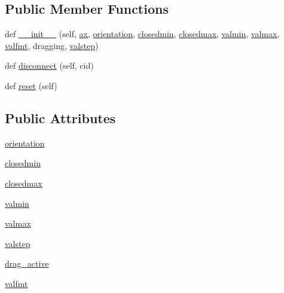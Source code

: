 \subsection*{Public Member Functions}
\begin{DoxyCompactItemize}
\item 
def \hyperlink{classmatplotlib_1_1widgets_1_1SliderBase_a01c50f7d46e6e75af375c1a9241daeb4}{\+\_\+\+\_\+init\+\_\+\+\_\+} (self, \hyperlink{classmatplotlib_1_1widgets_1_1AxesWidget_ac0722858b7001d10a42055dc90420b4f}{ax}, \hyperlink{classmatplotlib_1_1widgets_1_1SliderBase_a93fc7869d4f43ed80c0eb37f862a7867}{orientation}, \hyperlink{classmatplotlib_1_1widgets_1_1SliderBase_aaacaef7e24bbf0e58411e11bab0f6251}{closedmin}, \hyperlink{classmatplotlib_1_1widgets_1_1SliderBase_a250e05d4e913ab64f1aab8199139121e}{closedmax}, \hyperlink{classmatplotlib_1_1widgets_1_1SliderBase_a993fb203f18eed971f45cc5cefe46b75}{valmin}, \hyperlink{classmatplotlib_1_1widgets_1_1SliderBase_a43671ae3d4d11d7b5cc1f057d6906d7d}{valmax}, \hyperlink{classmatplotlib_1_1widgets_1_1SliderBase_a30eb223d32ca95faa7bd011bb5dc1836}{valfmt}, dragging, \hyperlink{classmatplotlib_1_1widgets_1_1SliderBase_acc8d1e84849e95324ba5261011d7ffdc}{valstep})
\item 
def \hyperlink{classmatplotlib_1_1widgets_1_1SliderBase_a7516628d3047311581947d97cf45fb7c}{disconnect} (self, cid)
\item 
def \hyperlink{classmatplotlib_1_1widgets_1_1SliderBase_a71d66da13cf09d2e78f82e37ef7198a5}{reset} (self)
\end{DoxyCompactItemize}
\subsection*{Public Attributes}
\begin{DoxyCompactItemize}
\item 
\hyperlink{classmatplotlib_1_1widgets_1_1SliderBase_a93fc7869d4f43ed80c0eb37f862a7867}{orientation}
\item 
\hyperlink{classmatplotlib_1_1widgets_1_1SliderBase_aaacaef7e24bbf0e58411e11bab0f6251}{closedmin}
\item 
\hyperlink{classmatplotlib_1_1widgets_1_1SliderBase_a250e05d4e913ab64f1aab8199139121e}{closedmax}
\item 
\hyperlink{classmatplotlib_1_1widgets_1_1SliderBase_a993fb203f18eed971f45cc5cefe46b75}{valmin}
\item 
\hyperlink{classmatplotlib_1_1widgets_1_1SliderBase_a43671ae3d4d11d7b5cc1f057d6906d7d}{valmax}
\item 
\hyperlink{classmatplotlib_1_1widgets_1_1SliderBase_acc8d1e84849e95324ba5261011d7ffdc}{valstep}
\item 
\hyperlink{classmatplotlib_1_1widgets_1_1SliderBase_a08e93d07851e9ff194396c445f91a45a}{drag\+\_\+active}
\item 
\hyperlink{classmatplotlib_1_1widgets_1_1SliderBase_a30eb223d32ca95faa7bd011bb5dc1836}{valfmt}
\end{DoxyCompactItemize}
